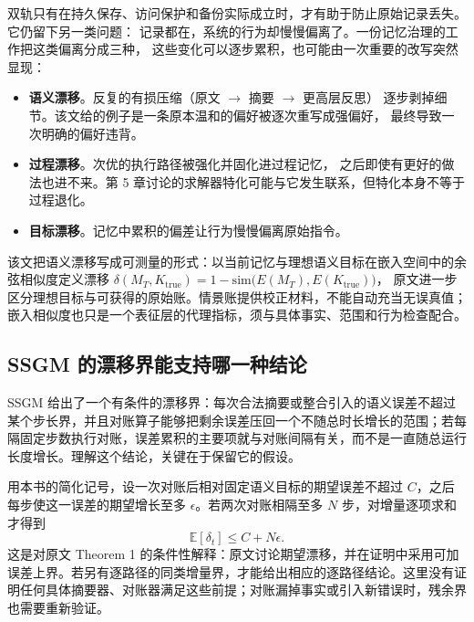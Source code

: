 \begin{sloppypar}
双轨只有在持久保存、访问保护和备份实际成立时，才有助于防止原始记录丢失。它仍留下另一类问题：
记录都在，系统的行为却慢慢偏离了。一份记忆治理的工作把这类偏离分成三种\cite{ssgm-2603}，
这些变化可以逐步累积，也可能由一次重要的改写突然显现：
\end{sloppypar}

\begin{itemize}
  \item \textbf{语义漂移}。反复的有损压缩（原文 $\rightarrow$ 摘要 $\rightarrow$ 更高层反思）
        逐步剥掉细节。该文给的例子是一条原本温和的偏好被逐次重写成强偏好，
        最终导致一次明确的偏好违背。
  \item \textbf{过程漂移}。次优的执行路径被强化并固化进过程记忆，
        之后即使有更好的做法也进不来。第 5 章讨论的求解器特化可能与它发生联系，但特化本身不等于过程退化。
  \item \textbf{目标漂移}。记忆中累积的偏差让行为慢慢偏离原始指令。
\end{itemize}

\begin{sloppypar}
该文把语义漂移写成可测量的形式：以当前记忆与理想语义目标在嵌入空间中的余弦相似度定义漂移
$\delta(M_T, K_{\text{true}})=1-\mathrm{sim}\big(E(M_T), E(K_{\text{true}})\big)$，
原文进一步区分理想目标与可获得的原始账。情景账提供校正材料，不能自动充当无误真值；嵌入相似度也只是一个表征层的代理指标，须与具体事实、范围和行为检查配合。
\end{sloppypar}

\subsection{SSGM 的漂移界能支持哪一种结论}
\label{sec:ch14-drift-bound}

SSGM 给出了一个有条件的漂移界：每次合法摘要或整合引入的语义误差不超过某个步长界，并且对账算子能够把剩余误差压回一个不随总时长增长的范围；若每隔固定步数执行对账，误差累积的主要项就与对账间隔有关，而不是一直随总运行长度增长\cite{ssgm-2603}。理解这个结论，关键在于保留它的假设。

用本书的简化记号，设一次对账后相对固定语义目标的期望误差不超过 $C$，之后每步使这一误差的期望增长至多 $\epsilon$。若两次对账相隔至多 $N$ 步，对增量逐项求和才得到
\[
 \mathbb E[\delta_t]\le C+N\epsilon.
\]
这是对原文 Theorem 1 的条件性解释：原文讨论期望漂移，并在证明中采用可加误差上界。若另有逐路径的同类增量界，才能给出相应的逐路径结论。这里没有证明任何具体摘要器、对账器满足这些前提；对账漏掉事实或引入新错误时，残余界也需要重新验证。

